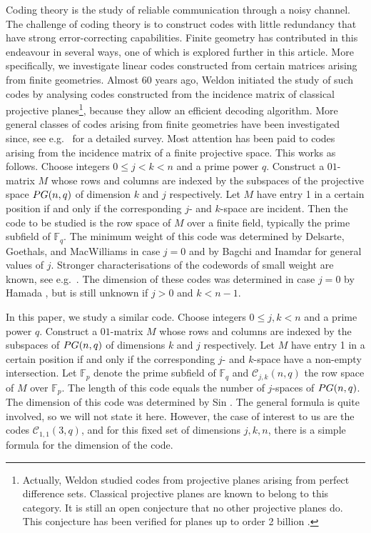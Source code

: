 \documentclass[a4paper]{article}
\theoremstyle{definition}
\newcommand{\FF}{\mathbb F}
\newcommand{\pg}{\textnormal{PG}}
\newcommand{\mc}{\mathcal C}
\begin{document}
Coding theory is the study of reliable communication through a noisy channel.
The challenge of coding theory is to construct codes with little redundancy that have strong error-correcting capabilities.
Finite geometry has contributed in this endeavour in several ways, one of which is explored further in this article.
More specifically, we investigate linear codes constructed from certain matrices arising from finite geometries.
Almost 60 years ago, Weldon \cite{weldon1966} initiated the study of such codes by analysing codes constructed from the incidence matrix of classical projective planes\footnote{Actually, Weldon \cite{weldon1966} studied codes from projective planes arising from perfect difference sets. Classical projective planes are known to belong to this category. It is still an open conjecture that no other projective planes do. This conjecture has been verified for planes up to order 2 billion \cite{BaumertGordon}.}, because they allow an efficient decoding algorithm.
More general classes of codes arising from finite geometries have been investigated since, see e.g.\ \cite{LavrauwC} for a detailed survey.
Most attention has been paid to codes arising from the incidence matrix of a finite projective space.
This works as follows.
Choose integers $0 \leq j < k < n$ and a prime power $q$.
Construct a $01$-matrix $M$ whose rows and columns are indexed by the subspaces of the projective space $\pg(n,q)$ of dimension $k$ and $j$ respectively.
Let $M$ have entry 1 in a certain position if and only if the corresponding $j$- and $k$-space are incident.
Then the code to be studied is the row space of $M$ over a finite field, typically the prime subfield of $\FF_q$.
The minimum weight of this code was determined by Delsarte, Goethals, and MacWilliams \cite{delsarte} in case $j=0$ and by Bagchi and Inamdar \cite{bagchi} for general values of $j$.
Stronger characterisations of the codewords of small weight are known, see e.g.\ \cite{adriaensen2023small}.
The dimension of these codes was determined in case $j=0$ by Hamada \cite{hamada}, but is still unknown if $j>0$ and $k < n-1$.

In this paper, we study a similar code.
Choose integers $0 \leq j,k < n$ and a prime power $q$.
Construct a $01$-matrix $M$ whose rows and columns are indexed by the subspaces of $\pg(n,q)$ of dimensions $k$ and $j$ respectively.
Let $M$ have entry 1 in a certain position if and only if the corresponding $j$- and $k$-space have a non-empty intersection.
Let $\FF_p$ denote the prime subfield of $\FF_q$ and $\mc_{j,k}(n,q)$ the row space of $M$ over $\FF_p$.
The length of this code equals the number of $j$-spaces of $\pg(n,q)$.
The dimension of this code was determined by Sin \cite{Sin:04}.
The general formula is quite involved, so we will not state it here.
However, the case of interest to us are the codes $\mc_{1,1}(3,q)$, and for this fixed set of dimensions $j,k,n$, there is a simple formula for the dimension of the code.
\end{document}
